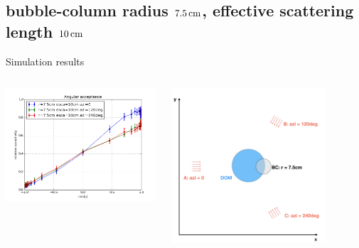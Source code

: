 \subsection{bubble-column radius $7.5\text{\,cm}$, effective scattering length $10\text{\,cm}$}
\begin{frame}[fragile]{Simulation results}
  \begin{columns}
    \begin{column}{0.5\textwidth}
      \includegraphics[width=\textwidth]{img/summer_scenario_r7-5cm_esca10cm}
    \end{column}
    \begin{column}{0.5\textwidth}
      \includegraphics[width=0.8\textwidth]{img/summerscenario-003}
    \end{column}
  \end{columns}


\end{frame}
